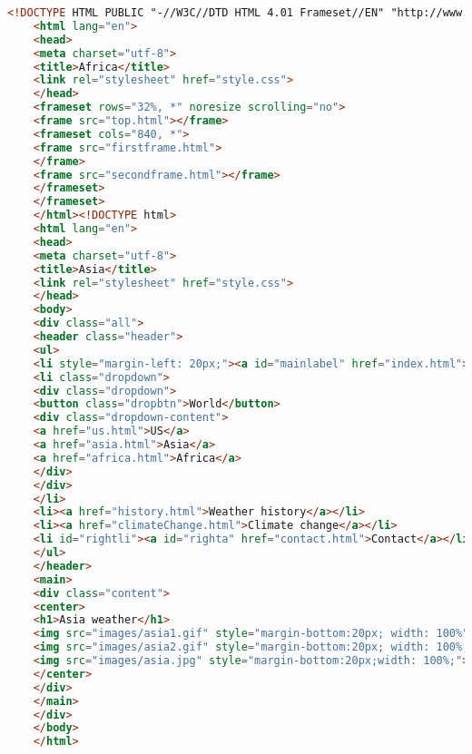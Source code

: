 \begin{lstlisting}[language=HTML,caption=Исходный код страницы Asia]
    <!DOCTYPE HTML PUBLIC "-//W3C//DTD HTML 4.01 Frameset//EN" "http://www.w3.org/TR/html4/frameset.dtd">
    <html lang="en">
    <head>
    <meta charset="utf-8">
    <title>Africa</title>
    <link rel="stylesheet" href="style.css">
    </head>
    <frameset rows="32%, *" noresize scrolling="no">
    <frame src="top.html"></frame>
    <frameset cols="840, *">
    <frame src="firstframe.html">
    </frame>
    <frame src="secondframe.html"></frame>
    </frameset>
    </frameset>
    </html><!DOCTYPE html>
    <html lang="en">
    <head>
    <meta charset="utf-8">
    <title>Asia</title>
    <link rel="stylesheet" href="style.css">
    </head>
    <body>
    <div class="all">
    <header class="header">
    <ul>
    <li style="margin-left: 20px;"><a id="mainlabel" href="index.html">Weather.org☔</a></li>
    <li class="dropdown">
    <div class="dropdown">
    <button class="dropbtn">World</button>
    <div class="dropdown-content">
    <a href="us.html">US</a>
    <a href="asia.html">Asia</a>
    <a href="africa.html">Africa</a>
    </div>
    </div>
    </li>
    <li><a href="history.html">Weather history</a></li>
    <li><a href="climateChange.html">Climate change</a></li>
    <li id="rightli"><a id="righta" href="contact.html">Contact</a></li>
    </ul>
    </header>
    <main>
    <div class="content">
    <center>
    <h1>Asia weather</h1>
    <img src="images/asia1.gif" style="margin-bottom:20px; width: 100%">
    <img src="images/asia2.gif" style="margin-bottom:20px; width: 100%;">
    <img src="images/asia.jpg" style="margin-bottom:20px;width: 100%;">
    </center>
    </div>
    </main>
    </div>
    </body>
    </html>
\end{lstlisting}


